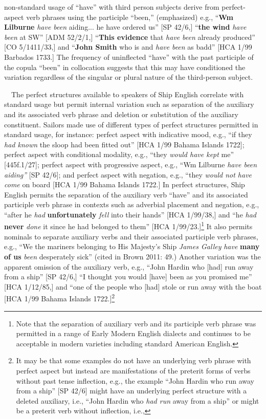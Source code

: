 \documentclass[12pt]{article}
\newenvironment{styleStandard}{\renewcommand\baselinestretch{1.0}\setlength\leftskip{0cm}\setlength\rightskip{0cm plus 1fil}\setlength\parindent{0cm}\setlength\parfillskip{0pt plus 1fil}\setlength\parskip{0in plus 1pt}\writerlistparindent\writerlistleftskip\leavevmode\normalfont\normalsize\writerlistlabel\ignorespaces}{\unskip\vspace{0in plus 1pt}\par}
\newcommand\writerlistleftskip{}
\newcommand\writerlistparindent{}
\newcommand\writerlistlabel{}
\begin{document}
\begin{styleStandard}
non-standard usage of “have” with third person subjects derive from perfect-aspect verb phrases using the participle “been,” (emphasized) e.g., “\textbf{Wm Lilburne }\textit{have been} aiding... he have ordered us” [SP 42/6,] “\textbf{the wind} \textit{have been} at SW” [ADM 52/2/1,] “\textbf{This evidence} that \textit{have} \textit{been} already produced” [CO 5/1411/33,] and “\textbf{John Smith} who is and \textit{have} \textit{been }as badd” [HCA 1/99 Barbados 1733.] The frequency of uninflected “have” with the past participle of the copula “been” in collocation suggests that this may have conditioned the variation regardless of the singular or plural nature of the third-person subject. 
\end{styleStandard}


\begin{styleStandard}
\ \ The perfect structures available to speakers of Ship English correlate with standard usage but permit internal variation such as separation of the auxiliary and its associated verb phrase and deletion or substitution of the auxiliary constituent. Sailors made use of different types of perfect structures permitted in standard usage, for instance: perfect aspect with indicative mood, e.g., “if they \textit{had known }the sloop had been fitted out” [HCA 1/99 Bahama Islands 1722]; perfect aspect with conditional modality, e.g., “they \textit{would have kept} me” [445f.1/27]; perfect aspect with progressive aspect, e.g., “Wm Lilburne \textit{have been aiding”} [SP 42/6]; and perfect aspect with negation, e.g., “they \textit{would not have come} on board{\textquotedbl} [HCA 1/99 Bahama Islands 1722.] In perfect structures, Ship English permits the separation of the auxiliary verb “have” and its associated participle verb phrase in contexts such as adverbial placement and negation, e.g., “after he \textit{had} \textbf{unfortunately} \textit{fell} into their hands” [HCA 1/99/38,] and “he \textit{had} \textbf{never }\textit{done} it since he had belonged to them” [HCA 1/99/23.]\footnote{ Note that the separation of auxiliary verb and its participle verb phrase was permitted in a range of Early Modern English dialects and continues to be acceptable in modern varieties including standard American English.} It also permits nominals to separate auxiliary verbs and their associated participle verb phrases, e.g., “We the mariners belonging to His Majesty’s Ship \textit{James Galley} \textit{have} \textbf{many of us}\textit{ been} desperately sick” (cited in Brown 2011: 49.) Another variation was the apparent omission of the auxiliary verb, e.g., “John Hardin who [had] run away from a ship” [SP 42/6,] “I thought you would [have] been as you promised me” [HCA 1/12/85,] and “one of the people who [had] stole or run away with the boat{\textquotedbl} [HCA 1/99 Bahama Islands 1722.]\footnote{ It may be that some examples do not have an underlying verb phrase with perfect aspect but instead are manifestations of the preterit forms of verbs without past tense inflection, e.g., the example “John Hardin who run away from a ship” [SP 42/6] might have an underlying perfect structure with a deleted auxiliary, i.e., “John Hardin who \textit{had run} away from a ship” or might be a preterit verb without inflection, i.e., 
\end{styleStandard}
\end{document}
